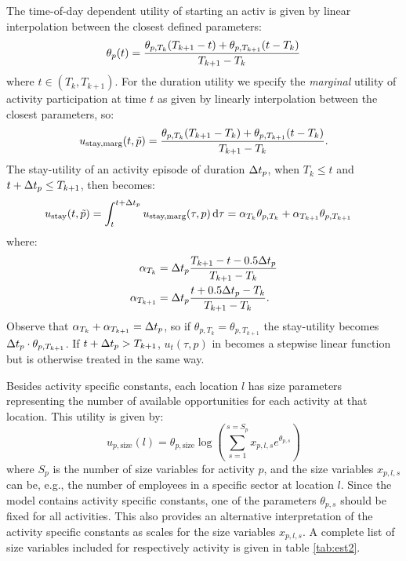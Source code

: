 The time-of-day dependent utility of starting an activ is given by linear interpolation between the closest defined parameters:
\begin{equation*}
\ac_p(t) = \frac{\ac_{p,T_k}(T_{k+1}-t)+\ac_{p,T_{k+1}}(t-T_k)}{T_{k+1}-T_{k}}
\end{equation*}
where $t\in(T_k,T_{k+1})$. For the duration utility we specify the \emph{marginal} utility of activity participation at time $t$ as given by linearly interpolation between the closest parameters, so:
\begin{equation*}
u_\text{stay,marg}(t,\act{p}) = \frac{\theta_{p,T_k}(T_{k+1}-T_k)+\theta_{p,T_{k+1}}(t-T_k) }{T_{k+1}-T_{k}}.
\end{equation*}
The stay-utility of an activity episode of duration $\Delta t_p$, when $T_k\leq t$ and $t+\Delta t_p\leq T_{k+1}$, then becomes:
\begin{equation} \label{eq:uacttime}
\begin{aligned}
u_\text{stay}(t,\act{p}) &= \int_t^{t+\dura{p}} u_\text{stay,marg}(\tau,p) %
\ud{\tau} = \alpha_{T_k}\theta_{p,T_k} + \alpha_{T_{k+1}}\theta_{p,T_{k+1}}%
\end{aligned}
\end{equation}
where:
\begin{align*}
\alpha_{T_k}&=\dura{p}\frac{T_{k+1} - t - 0.5 \dura{p}}{T_{k+1}-T_{k}}\\
\alpha_{T_{k+1}}&=\dura{p}\frac{t + 0.5\dura{p} - T_k}{T_{k+1}-T_{k}}.
\end{align*}
Observe that  $\alpha_{T_k} + \alpha_{T_{k+1}} = \Delta t_p$, so if $\theta_{p,T_k} = \theta_{p,T_{k+1}}$ the stay-utility becomes $\Delta t_p \cdot \theta_{p,T_{k+1}}$.
If $t+\Delta t_p> T_{k+1}$, $u_t(\tau,p)$ in  becomes a stepwise linear function but is otherwise treated in the same way.

Besides activity specific constants, each location $l$ has size parameters representing the number of available opportunities for each activity at that location. This utility is given by:
\begin{equation*}
u_{p,\text{size}}(l) =\theta_{p,\text{size}}\log \left( \sum_{s=1}^{s=S_p} x_{p,l,s}e^{\theta_{p,s}} \right)
\end{equation*}
where $S_p$ is the number of size variables for activity $p$, and the size variables $x_{p,l,s}$ can be, e.g., the number of employees in a specific sector at location $l$. Since the model contains activity specific constants, one of the parameters $\theta_{p,s}$ should be fixed for all activities. This also provides an alternative interpretation of the activity specific constants as scales for the size variables $x_{p,l,s}$. A complete list of size variables included for respectively activity is given in table \ref{tab:est2}. 

